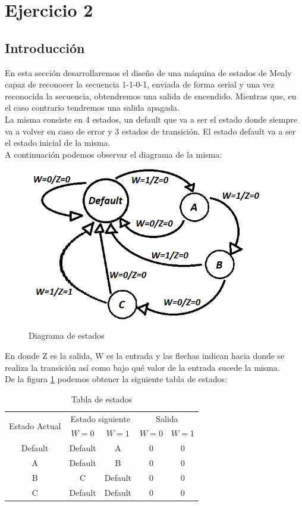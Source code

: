 \section{Ejercicio 2}
\subsection{Introducción}
En esta sección desarrollaremos el diseño de una máquina de estados de Mealy capaz de reconocer la secuencia 1-1-0-1, enviada de forma serial y una vez reconocida la secuencia, obtendremos una salida de encendido. Mientras que, en el caso contrario tendremos una salida apagada.\\
La misma consiste en 4 estados, un default que va a ser el estado donde siempre va a volver en caso de error y 3 estados de transición. El estado default va a ser el estado inicial de la misma.\\
A continuación podemos observar el diagrama de la misma:\\
\begin{figure}[H]
	\centering
	\includegraphics[scale=0.35]{Ejercicio2/Diagrama_de_estados.png}
	\caption{Diagrama de estados}
	\label{f:Mealy}
\end{figure}
En donde Z es la salida, W es la entrada y las flechas indican hacia donde se realiza la transición así como bajo qué valor de la entrada sucede la misma.\\
De la figura \ref{f:Mealy} podemos obtener la siguiente tabla de estados:\\
\begin{table}[h!]
	\begin{center}
		\caption{Tabla de estados}
		\begin{tabular}{|c|c c|c c|}
		\hline
		\multirow{2}{*}{Estado Actual} & \multicolumn{2}{|c|}{Estado siguiente} & \multicolumn{2}{|c|}{Salida}\\
		& $W=0$ & $W=1$ & $W=0$ & $W=1$\\
		\hline
		Default & Default & A & 0 & 0\\
		\hline
		A & Default & B & 0 & 0\\
		\hline
		B & C & Default & 0 & 0\\
		\hline
		C & Default & Default & 0 & 0\\
		\hline
		\end{tabular}
	\end{center}
\end{table}\\
